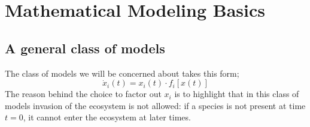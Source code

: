 \chapter{Mathematical Modeling Basics}

\section{A general class of models}
The class of models we will be concerned about takes this form;
\begin{equation}
    \dot{x}_i(t) = x_i(t)\cdot f_i[x(t)]
\end{equation}
The reason behind the choice to factor out $x_i$ is to highlight that in this class of models invasion of the ecosystem is not allowed: if a species is not present at time $t=0$, it cannot enter the ecosystem at later times. 

